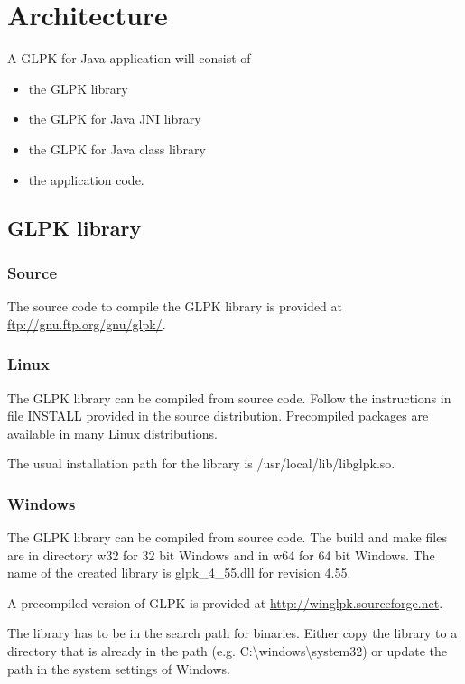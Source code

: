 \documentclass[a4paper,11pt]{report}
\newcommand{\glpkVersionMajor}{4}
\newcommand{\glpkVersionMinor}{55}
\begin{document}
\chapter{Architecture}
A GLPK for Java application will consist of
\begin{itemize}
\item the GLPK library
\item the GLPK for Java JNI library
\item the GLPK for Java class library
\item the application code.
\end{itemize}

\section{GLPK library}

\subsection{Source}
The source code to compile the GLPK library is provided at \linebreak\href{ftp://gnu.ftp.org/gnu/glpk/}{ftp://gnu.ftp.org/gnu/glpk/}.

\subsection{Linux}
The GLPK library can be compiled from source code. Follow the instructions in file INSTALL provided in the source distribution. Precompiled packages are available in many Linux distributions.

The usual installation path for the library is /usr/local/lib/libglpk.so.
\subsection{Windows}
The GLPK library can be compiled from source code. The build and make files are in directory w32 for 32 bit Windows and in w64 for 64 bit Windows. The name of the created library is glpk\_\glpkVersionMajor\_\glpkVersionMinor.dll for revision \glpkVersionMajor.\glpkVersionMinor.

A precompiled version of GLPK is provided at \href{http://winglpk.sourceforge.net}{http://winglpk.sourceforge.net}.

The library has to be in the search path for binaries. Either copy the library to a directory that is already in the path (e.g. C:\textbackslash windows\textbackslash system32) or update the path in the system settings of Windows.
\end{document}
